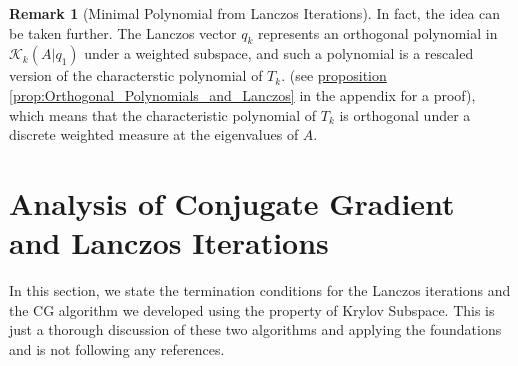 \documentclass[]{article}
\theoremstyle{definition}
\newtheorem{remark}{Remark}[subsection]  %
\begin{document}
\begin{remark}[Minimal Polynomial from Lanczos Iterations]
                \par
                In fact, the idea can be taken further. The Lanczos vector $q_k$ represents an orthogonal polynomial in $\mathcal K_k(A|q_1)$ under a weighted subspace, and such a polynomial is a rescaled version of the characterstic polynomial of $T_k$. (see \hyperref[prop:Orthogonal_Polynomials_and_Lanczos]{proposition \ref*{prop:Orthogonal_Polynomials_and_Lanczos}} in the appendix for a proof), which means that the characteristic polynomial of $T_k$ is orthogonal under a discrete weighted measure at the eigenvalues of $A$. 
            \end{remark}
            
\section{Analysis of Conjugate Gradient and Lanczos Iterations}
    In this section, we state the termination conditions for the Lanczos iterations and the CG algorithm we developed using the property of Krylov Subspace. This is just a thorough discussion of these two algorithms and applying the foundations and is not following any references.
\end{document}
